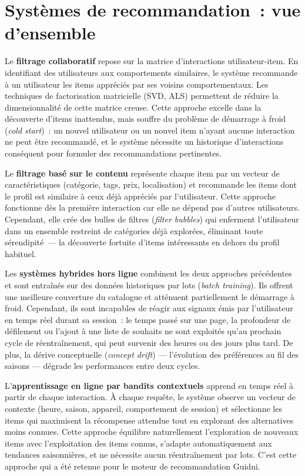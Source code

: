 \section{Systèmes de recommandation~: vue d'ensemble}

Le \textbf{filtrage collaboratif} repose sur la matrice d'interactions utilisateur-item. En
identifiant des utilisateurs aux comportements similaires, le système recommande à un utilisateur
les items appréciés par ses \og{}voisins\fg{} comportementaux. Les techniques de factorisation
matricielle (SVD, ALS) permettent de réduire la dimensionnalité de cette matrice creuse. Cette
approche excelle dans la découverte d'items inattendus, mais souffre du problème de démarrage
à froid (\textit{cold start})~: un nouvel utilisateur ou un nouvel item n'ayant aucune interaction
ne peut être recommandé, et le système nécessite un historique d'interactions conséquent pour
formuler des recommandations pertinentes.

Le \textbf{filtrage basé sur le contenu} représente chaque item par un vecteur de
caractéristiques (catégorie, tags, prix, localisation) et recommande les items dont le profil
est similaire à ceux déjà appréciés par l'utilisateur. Cette approche fonctionne dès la première
interaction car elle ne dépend pas d'autres utilisateurs. Cependant, elle crée des bulles de
filtres (\textit{filter bubbles}) qui enferment l'utilisateur dans un ensemble restreint de
catégories déjà explorées, éliminant toute sérendipité~--- la découverte fortuite d'items
intéressants en dehors du profil habituel.

Les \textbf{systèmes hybrides hors ligne} combinent les deux approches précédentes et sont
entraînés sur des données historiques par lots (\textit{batch training}). Ils offrent une
meilleure couverture du catalogue et atténuent partiellement le démarrage à froid. Cependant, ils
sont incapables de réagir aux signaux émis par l'utilisateur en temps réel durant sa session~:
le temps passé sur une page, la profondeur de défilement ou l'ajout à une liste de souhaits ne
sont exploités qu'au prochain cycle de réentraînement, qui peut survenir des heures ou des jours
plus tard. De plus, la dérive conceptuelle (\textit{concept drift}) --- l'évolution des
préférences au fil des saisons --- dégrade les performances entre deux cycles.

L'\textbf{apprentissage en ligne par bandits contextuels} apprend en temps réel à partir de
chaque interaction. À chaque requête, le système observe un vecteur de contexte (heure, saison,
appareil, comportement de session) et sélectionne les items qui maximisent la récompense attendue
tout en explorant des alternatives moins connues. Cette approche équilibre naturellement
l'exploration de nouveaux items avec l'exploitation des items connus, s'adapte automatiquement
aux tendances saisonnières, et ne nécessite aucun réentraînement par lots. C'est cette approche
qui a été retenue pour le moteur de recommandation Guidni.

